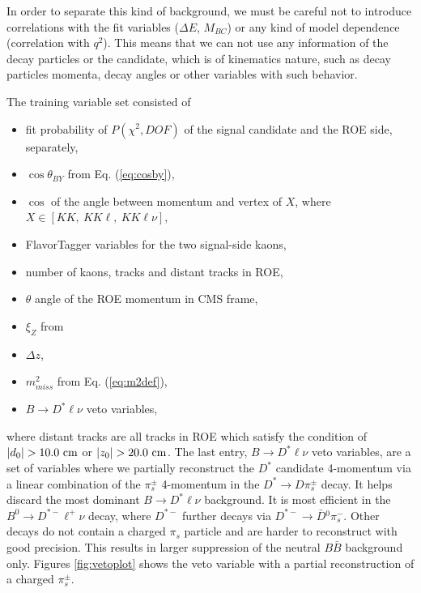 In order to separate this kind of background, we must be careful not to introduce correlations with the fit variables ($\Delta E$, $M_{BC}$) or any kind of model dependence (correlation with $q^2$). This means that we can not use any information of the decay particles or the candidate, which is of kinematics nature, such as decay particles momenta, decay angles or other variables with such behavior.

The training variable set consisted of
\begin{itemize}
	\item fit probability of $P(\chi^2,DOF)$ of the signal candidate and the ROE side, separately,
	\item $\cos\theta_{BY}$ from Eq. (\ref{eq:cosby}),
	\item $\cos$ of the angle between momentum and vertex of $X$, where $X \in [KK,~KK\ell,~KK\ell\nu]$,
	\item FlavorTagger variables for the two signal-side kaons,
	\item number of kaons, tracks and distant tracks in ROE,
	\item $\theta$ angle of the ROE momentum in CMS frame,
	\item $\xi_Z$ from \cite{PhysRevD.83.032007}
	\item $\Delta z$,
	\item $m_{miss}^2$ from Eq. (\ref{eq:m2def}),
	\item $B \to D^* \ell \nu$ veto variables,
\end{itemize}
where distant tracks are all tracks in ROE which satisfy the condition of $\vert d_0 \vert  > 10.0\mathrm{~cm}$ or $\vert z_0 \vert > 20.0\mathrm{~cm}$. The last entry, $B \to D^* \ell \nu$ veto variables, are a set of variables where we partially reconstruct the $D^*$ candidate 4-momentum via a linear combination of the $\pi^\pm_s$ 4-momentum in the $D^* \to D \pi_s^\pm$ decay. It helps discard the most dominant $B \to D^* \ell \nu$ background. It is most efficient in the $B^0 \to D^{*-} \ell^+ \nu$ decay, where $D^{*-}$ further decays via $D^{*-} \to \bar D {}^0 \pi^-_s$. Other decays do not contain a charged $\pi_s$ particle and are harder to reconstruct with good precision. This results in larger suppression of the neutral $B \bar B$ background only. Figures \ref{fig:vetoplot} shows the veto variable with a partial reconstruction of a charged $\pi_s^\pm$.

